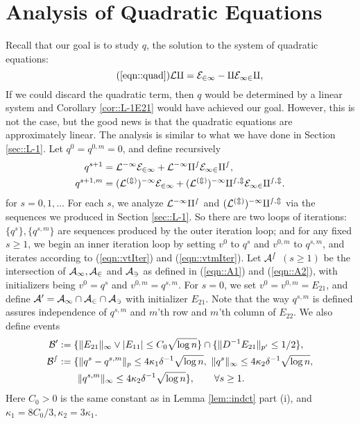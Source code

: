 \documentclass[12pt]{article}%
\theoremstyle{plain}%
\theoremstyle{remark}
\begin{document}
\section{Analysis of Quadratic Equations}\label{sec::quad}
Recall that our goal is to study $q$, the solution to the system of quadratic equations:
\begin{equation}\tag{\ref{eqn::quad}}
\cal{L} q = E_{21} - qE_{12}q,
\end{equation}
If we could discard the quadratic term, then $q$ would be determined by a linear system and Corollary \ref{cor::L-1E21} would have achieved our goal. However, this is not the case, but the good news is that the quadratic equations are approximately linear.
The analysis is similar to what we have done in Section \ref{sec::L-1}. Let $q^0 = q^{0,m} = 0$, and define recursively
\begin{align*}
q^{s+1} &= \cal{L}^{-1} E_{21} + \cal{L}^{-1} q^s E_{12} q^s, \\
q^{s+1, m} &= (\cal{L}^{(m)})^{-1} E_{21} +  (\cal{L}^{(m)})^{-1} q^{s,m} E_{12} q^{s,m}.
\end{align*}
for $s = 0,1,\ldots$ For each $s$, we analyze $\cal{L}^{-1} q^s$ and $(\cal{L}^{(m)})^{-1} q^{s,m}$ via the sequences we produced in Section \ref{sec::L-1}. So there are two loops of iterations: $\{q^s\}, \{q^{s,m}\}$ are sequences produced by the outer iteration loop; and for any fixed $s \ge 1$, we begin an inner iteration loop by setting $v^0$ to $q^s$ and $v^{0,m}$ to $q^{s,m}$, and iterates according to (\ref{eqn::vtIter}) and (\ref{eqn::vtmIter}). Let $\cal{A}^s$ $(s \ge 1)$ be the intersection of $\cal{A}_1, \cal{A}_2$ and $\cal{A}_3$ as defined in (\ref{eqn::A1}) and (\ref{eqn::A2}), with initializers being $v^0 = q^s$ and $v^{0,m} = q^{s,m}$. For $s=0$, we set $v^0 = v^{0,m} = E_{21}$, and define $\cal{A}^0 = \cal{A}_1 \cap \cal{A}_2 \cap \cal{A}_3$ with initializer $E_{21}$. Note that the way $q^{s, m}$ is defined assures independence of $q^{s,m}$ and $m$'th row and $m$'th column of $E_{22}$. We also define events
\begin{align*}
\cal{B}^0 &:= \{  \| E_{21} \|_{\infty} \vee |E_{11}| \le C_0 \sqrt{\log n} \} \cap \{  \| D^{-1} E_{21} \|_{p'} \le 1/2 \},
 \\
\cal{B}^s &:= \{ \| q^s - q^{s,m} \|_{p} \le 4\kappa_1\delta^{-1} \sqrt{\log n}, ~ \| q^s \|_{\infty} \le 4\kappa_2\delta^{-1} \sqrt{\log n}, \\
&~~~~~~ \| q^{s,m} \|_{\infty} \le 4\kappa_2\delta^{-1} \sqrt{\log n} \}, \qquad \forall s \ge 1.
\end{align*}
Here $C_0>0$ is the same constant as in Lemma \ref{lem::indct} part (i), and $\kappa_1 = 8C_0/3, \kappa_2 = 3\kappa_1$. \\
\end{document}
